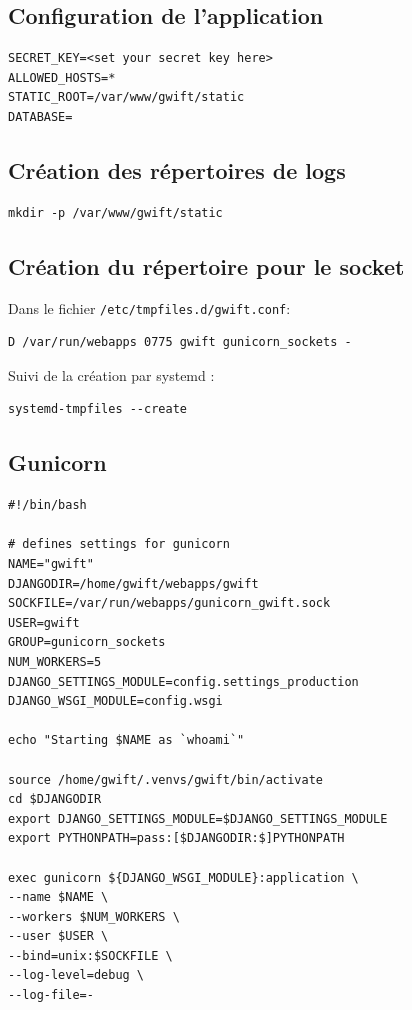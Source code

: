 \documentclass[11pt]{amsbook}
\begin{document}
\hypertarget{x-configuration-de-l’application}{\subsection{Configuration de l’application}}
\begin{verbatim}
SECRET_KEY=<set your secret key here> 
ALLOWED_HOSTS=*
STATIC_ROOT=/var/www/gwift/static
DATABASE= 
\end{verbatim}


\hypertarget{x-création-des-répertoires-de-logs}{\subsection{Création des répertoires de logs}}
\begin{verbatim}
mkdir -p /var/www/gwift/static
\end{verbatim}

\hypertarget{x-création-du-répertoire-pour-le-socket}{\subsection{Création du répertoire pour le socket}}
Dans le fichier \texttt{/etc/tmpfiles.d/gwift.conf}:


\begin{verbatim}
D /var/run/webapps 0775 gwift gunicorn_sockets -
\end{verbatim}

Suivi de la création par systemd :


\begin{verbatim}
systemd-tmpfiles --create
\end{verbatim}

\hypertarget{x-gunicorn}{\subsection{Gunicorn}}
\begin{verbatim}
#!/bin/bash

# defines settings for gunicorn
NAME="gwift"
DJANGODIR=/home/gwift/webapps/gwift
SOCKFILE=/var/run/webapps/gunicorn_gwift.sock
USER=gwift
GROUP=gunicorn_sockets
NUM_WORKERS=5
DJANGO_SETTINGS_MODULE=config.settings_production
DJANGO_WSGI_MODULE=config.wsgi

echo "Starting $NAME as `whoami`"

source /home/gwift/.venvs/gwift/bin/activate
cd $DJANGODIR
export DJANGO_SETTINGS_MODULE=$DJANGO_SETTINGS_MODULE
export PYTHONPATH=pass:[$DJANGODIR:$]PYTHONPATH

exec gunicorn ${DJANGO_WSGI_MODULE}:application \
--name $NAME \
--workers $NUM_WORKERS \
--user $USER \
--bind=unix:$SOCKFILE \
--log-level=debug \
--log-file=-
\end{verbatim}
\end{document}
